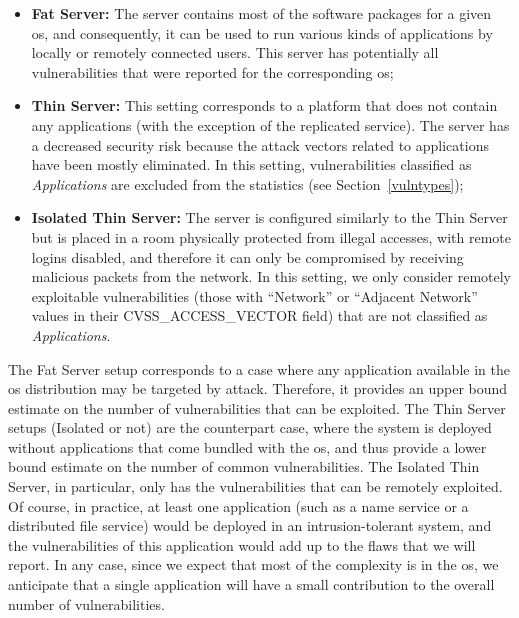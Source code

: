 \begin{itemize}

\item \textbf{Fat Server:} The server contains most of the software packages for a given \gls{os}, and consequently, it can be used to run various kinds of applications by locally or remotely connected users. This server has potentially all vulnerabilities that were reported for the corresponding \gls{os};

\item \textbf{Thin Server:} This setting corresponds to a platform that does not contain any applications (with the exception of the replicated service). The server has a decreased security risk because the attack vectors related to applications have been mostly eliminated. In this setting, vulnerabilities classified as \textit{Applications} are excluded from the statistics (see Section~\ref{vulntypes});

\item \textbf{Isolated Thin Server:} The server is configured similarly to the Thin Server but is placed in a room physically protected from illegal accesses, with remote logins disabled, and therefore it can only be compromised by receiving malicious packets from the network. In this setting, we only consider remotely exploitable vulnerabilities (those with ``Network'' or ``Adjacent Network'' values in their CVSS\_ACCESS\_VECTOR field) that are not classified as \textit{Applications}.

\end{itemize}

The Fat Server setup corresponds to a case where any application available in the \gls{os} distribution may be targeted by attack. 
Therefore, it provides an upper bound estimate on the number of vulnerabilities that can be exploited. 
The Thin Server setups (Isolated or not) are the counterpart case, where the system is deployed without applications that come bundled with the \gls{os}, and thus provide a lower bound estimate on the number of common vulnerabilities. 
The Isolated Thin Server, in particular, only has the vulnerabilities that can be remotely exploited. 
Of course, in practice, at least one application (such as a name service or a distributed file service) would be deployed in an intrusion-tolerant system, and the vulnerabilities of this application would add up to the flaws that we will report. 
In any case, since we expect that most of the complexity is in the \gls{os}, we anticipate that a single application will have a small contribution to the overall number of vulnerabilities.



